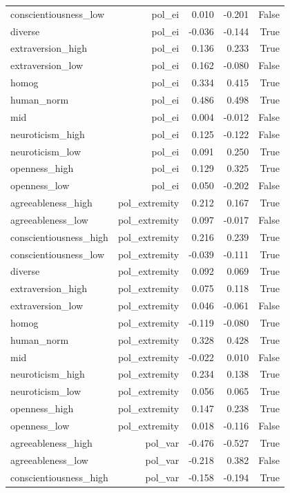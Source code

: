 \documentclass[11pt]{article}
\begin{document}
\begin{longtable}{@{}lrrrr@{}}
conscientiousness\_low & pol\_ei & 0.010 & -0.201 & False \\
diverse & pol\_ei & -0.036 & -0.144 & True \\
extraversion\_high & pol\_ei & 0.136 & 0.233 & True \\
extraversion\_low & pol\_ei & 0.162 & -0.080 & False \\
homog & pol\_ei & 0.334 & 0.415 & True \\
human\_norm & pol\_ei & 0.486 & 0.498 & True \\
mid & pol\_ei & 0.004 & -0.012 & False \\
neuroticism\_high & pol\_ei & 0.125 & -0.122 & False \\
neuroticism\_low & pol\_ei & 0.091 & 0.250 & True \\
openness\_high & pol\_ei & 0.129 & 0.325 & True \\
openness\_low & pol\_ei & 0.050 & -0.202 & False \\
agreeableness\_high & pol\_extremity & 0.212 & 0.167 & True \\
agreeableness\_low & pol\_extremity & 0.097 & -0.017 & False \\
conscientiousness\_high & pol\_extremity & 0.216 & 0.239 & True \\
conscientiousness\_low & pol\_extremity & -0.039 & -0.111 & True \\
diverse & pol\_extremity & 0.092 & 0.069 & True \\
extraversion\_high & pol\_extremity & 0.075 & 0.118 & True \\
extraversion\_low & pol\_extremity & 0.046 & -0.061 & False \\
homog & pol\_extremity & -0.119 & -0.080 & True \\
human\_norm & pol\_extremity & 0.328 & 0.428 & True \\
mid & pol\_extremity & -0.022 & 0.010 & False \\
neuroticism\_high & pol\_extremity & 0.234 & 0.138 & True \\
neuroticism\_low & pol\_extremity & 0.056 & 0.065 & True \\
openness\_high & pol\_extremity & 0.147 & 0.238 & True \\
openness\_low & pol\_extremity & 0.018 & -0.116 & False \\
agreeableness\_high & pol\_var & -0.476 & -0.527 & True \\
agreeableness\_low & pol\_var & -0.218 & 0.382 & False \\
conscientiousness\_high & pol\_var & -0.158 & -0.194 & True \\

\end{longtable}
\end{document}
